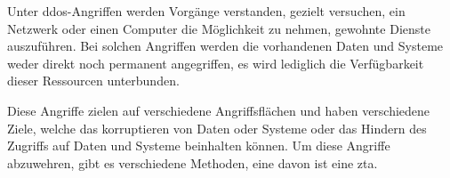 \begin{definition}
    \label{def:ddos}
    Unter \ac{ddos}-Angriffen werden Vorgänge verstanden, gezielt versuchen, ein Netzwerk oder einen Computer die Möglichkeit zu nehmen, gewohnte Dienste auszuführen.
    Bei solchen Angriffen werden die vorhandenen Daten und Systeme weder direkt noch permanent angegriffen, es wird lediglich die Verfügbarkeit dieser Ressourcen unterbunden.\autocite[\vglf][]{ddos-definition-2003}
\end{definition}

Diese Angriffe zielen auf verschiedene Angriffsflächen und haben verschiedene Ziele, welche das korruptieren von Daten oder Systeme oder das Hindern des Zugriffs auf Daten und Systeme beinhalten können.
Um diese Angriffe abzuwehren, gibt es verschiedene Methoden, eine davon ist eine \ac{zta}.

